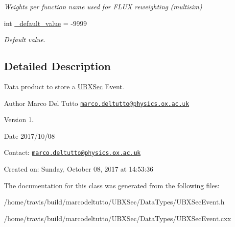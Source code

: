 \begin{DoxyCompactItemize}
\begin{DoxyCompactList}\small\item\em Weights per function name used for F\-L\-U\-X reweighting (multisim) \end{DoxyCompactList}\item 
\hypertarget{classUBXSecEvent_a88e5ff2c7d0db95750e980740231d80b}{int \hyperlink{classUBXSecEvent_a88e5ff2c7d0db95750e980740231d80b}{\-\_\-default\-\_\-value} = -\/9999}\label{classUBXSecEvent_a88e5ff2c7d0db95750e980740231d80b}

\begin{DoxyCompactList}\small\item\em Default value. \end{DoxyCompactList}\end{DoxyCompactItemize}


\subsection{Detailed Description}
Data product to store a \hyperlink{classUBXSec}{U\-B\-X\-Sec} Event. 

\begin{DoxyAuthor}{Author}
Marco Del Tutto \href{mailto:marco.deltutto@physics.ox.ac.uk}{\tt marco.\-deltutto@physics.\-ox.\-ac.\-uk}
\end{DoxyAuthor}
\begin{DoxyVersion}{Version}
1.
\end{DoxyVersion}
\begin{DoxyDate}{Date}
2017/10/08
\end{DoxyDate}
Contact\-: \href{mailto:marco.deltutto@physics.ox.ac.uk}{\tt marco.\-deltutto@physics.\-ox.\-ac.\-uk}

Created on\-: Sunday, October 08, 2017 at 14\-:53\-:36 

The documentation for this class was generated from the following files\-:\begin{DoxyCompactItemize}
\item 
/home/travis/build/marcodeltutto/\-U\-B\-X\-Sec/\-Data\-Types/U\-B\-X\-Sec\-Event.\-h\item 
/home/travis/build/marcodeltutto/\-U\-B\-X\-Sec/\-Data\-Types/U\-B\-X\-Sec\-Event.\-cxx\end{DoxyCompactItemize}
